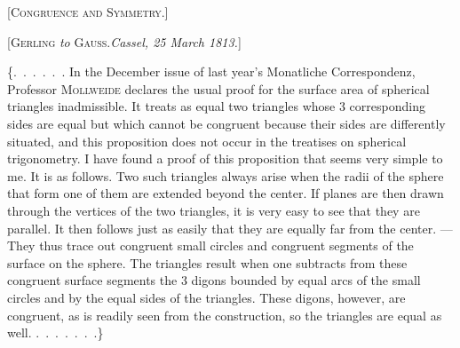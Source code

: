 \clearpage
{}%
\begin{center}
{\Large[\textsc{Congruence and Symmetry.}]}
\end{center}

\par\bigskip

\begin{center}
[\textsc{Gerling} \emph{to} \textsc{Gauss}.\quad \emph{Cassel, 25 March 1813.}]
\end{center}

\{\mbox{.\ .\ .\ .\ .\ .} In the December issue of last year's Monatliche Correspondenz, Professor \textsc{Mollweide} declares the usual proof for the surface area of spherical triangles inadmissible. It treats as equal two triangles whose 3 corresponding sides are equal but which cannot be congruent because their sides are differently situated, and this proposition does not occur in the treatises on spherical trigonometry. I have found a proof of this proposition that seems very simple to me. It is as follows. Two such triangles always arise when the radii of the sphere that form one of them are extended beyond the center. If planes are then drawn through the vertices of the two triangles, it is very easy to see that they are parallel. It then follows just as easily that they are equally far from the center. --- They thus trace out congruent small circles and congruent segments of the surface on the sphere. The triangles result when one subtracts from these congruent surface segments the 3 digons bounded by equal arcs of the small circles and by the equal sides of the triangles. These digons, however, are congruent, as is readily seen from the construction, so the triangles are equal as well.
\mbox{.\ .\ .\ .\ .\ .\ .}\}

\par\bigskip
